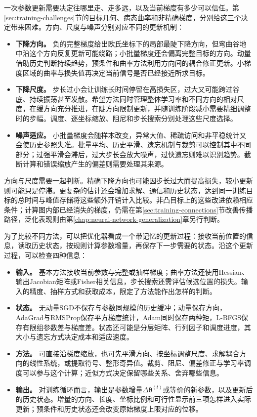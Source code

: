 一次参数更新需要决定往哪里走、走多远，以及当前梯度有多少可以信任。第\ref{sec:training-challenges}节的目标几何、病态曲率和非精确梯度，分别给这三个决定带来困难。方向、尺度与噪声分别对应不同的更新机制：
\begin{itemize}
  \item \textbf{下降方向。} 负的完整梯度给出欧氏坐标下的局部最陡下降方向，但弯曲谷地中沿这个方向反复更新可能绕路；小批量梯度还会偏离完整目标的方向。动量借助历史判断持续趋势，预条件和曲率方法利用方向间的耦合修正更新。小梯度区域的曲率与损失值再决定当前信号是否已经接近所求目标。
  \item \textbf{下降尺度。} 步长过小会让训练长时间停留在高损失区，过大又可能跨过谷底、持续振荡甚至发散。希望方法同时管理整体学习率和不同方向的相对尺度，在缓方向充分推进，在陡方向限制更新，并随训练阶段减小需要精细调整时的步幅。调度、逐坐标缩放、阻尼和步长搜索分别处理这些尺度选择。
  \item \textbf{噪声适应。} 小批量梯度会随样本改变，异常大值、稀疏访问和非平稳统计又会使历史参照失准。批量平均、历史平滑、遗忘机制与裁剪可以控制其中不同部分；过强平滑会滞后，过大步长会放大噪声，过快遗忘则难以识别趋势。截断计算和错误缩放产生的偏差则需要处理其来源。
\end{itemize}
方向与尺度需要一起判断。精确下降方向也可能因步长过大而提高损失，较小更新则可能只是停滞。更复杂的估计还会增加求解、通信和历史状态，达到同一训练目标的总时间与峰值存储将这些额外开销计入比较。非凸目标上的这些改进依赖相应条件；计算图内部已经消失的梯度，仍需在第\ref{sec:training-connections}节改善传播路径，泛化表现则由第\ref{chap:neural-network-generalization}章另行判断。

为了比较不同方法，可以把优化器看成一个带记忆的更新过程：接收当前位置的信息，读取历史状态，按规则计算参数增量，再保存下一步需要的状态。沿这个更新过程，可以检查四种信息：
\begin{itemize}
  \item \textbf{输入。} 基本方法接收当前参数与完整或抽样梯度；曲率方法还使用Hessian、输出Jacobian矩阵或Fisher相关信息，步长搜索还需评估候选位置的损失。输入的精度、抽样方式和获取成本，限定了方法能作出怎样的判断。
  \item \textbf{状态。} 无动量SGD不保存与参数同规模的历史缓冲；动量保存方向，AdaGrad与RMSProp保存平方梯度统计，Adam同时保存两种矩，L-BFGS保存有限组参数差与梯度差。状态还可能是分层矩阵、行列因子和调度进度，其大小与遗忘方式决定成本和适应速度。
  \item \textbf{方法。} 可直接沿梯度缩放，也可先平滑方向、按坐标调整尺度、求解耦合方向的线性系统，或提取符号、整形奇异值。裁剪、阻尼、偏差修正与学习率调度可以参与这个计算；近似方式决定保留哪些关系、舍弃哪些信息。
  \item \textbf{输出。} 对训练循环而言，输出是参数增量$\Delta\bm\theta^{(t)}$或等价的新参数，以及更新后的历史状态。增量的方向、长度、坐标比例和可行性显示前三项怎样进入实际更新；预条件和历史状态还会改变原始梯度上限对应的位移。
\end{itemize}

